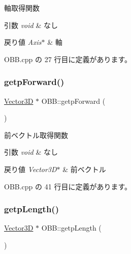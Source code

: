 軸取得関数 


\begin{DoxyParams}{引数}
{\em void} & なし \\
\hline
\end{DoxyParams}

\begin{DoxyRetVals}{戻り値}
{\em Axis$\ast$} & 軸 \\
\hline
\end{DoxyRetVals}


 O\+B\+B.\+cpp の 27 行目に定義があります。

\mbox{\label{class_o_b_b_a57d13d599712dae38ae6bad1ee564541}} 
\subsubsection{\texorpdfstring{getp\+Forward()}{getpForward()}}
{\footnotesize\ttfamily \mbox{\hyperlink{class_vector3_d}{Vector3D}} $\ast$ O\+B\+B\+::getp\+Forward (\begin{DoxyParamCaption}{ }\end{DoxyParamCaption})}



前ベクトル取得関数 


\begin{DoxyParams}{引数}
{\em void} & なし \\
\hline
\end{DoxyParams}

\begin{DoxyRetVals}{戻り値}
{\em Vector3\+D$\ast$} & 前ベクトル \\
\hline
\end{DoxyRetVals}


 O\+B\+B.\+cpp の 41 行目に定義があります。

\mbox{\label{class_o_b_b_a831280fe9affdea9bd5c4c6f28d4a9cc}} 
\subsubsection{\texorpdfstring{getp\+Length()}{getpLength()}}
{\footnotesize\ttfamily \mbox{\hyperlink{class_vector3_d}{Vector3D}} $\ast$ O\+B\+B\+::getp\+Length (\begin{DoxyParamCaption}{ }\end{DoxyParamCaption})}



